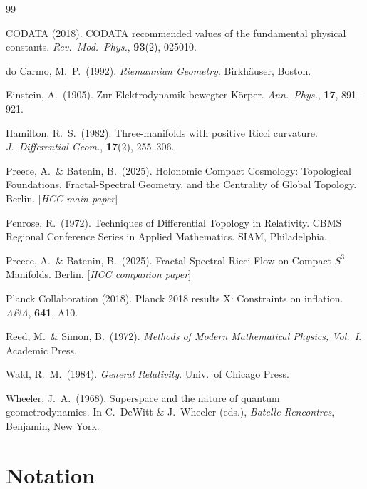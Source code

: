 \documentclass[12pt,a4paper]{article}
\theoremstyle{plain}
\theoremstyle{definition}
\theoremstyle{remark}
\begin{document}
\newpage
\begin{thebibliography}{99}

  CODATA (2018). CODATA recommended values of the fundamental physical constants.
  \textit{Rev.\ Mod.\ Phys.}, \textbf{93}(2), 025010.

  do Carmo, M.\ P.\ (1992). \textit{Riemannian Geometry}. Birkh\"auser, Boston.

  Einstein, A.\ (1905). Zur Elektrodynamik bewegter K\"orper.
  \textit{Ann.\ Phys.}, \textbf{17}, 891--921.

  Hamilton, R.\ S.\ (1982). Three-manifolds with positive Ricci curvature.
  \textit{J.\ Differential Geom.}, \textbf{17}(2), 255--306.

  Preece, A.\ \& Batenin, B.\ (2025).
  Holonomic Compact Cosmology: Topological Foundations,
  Fractal-Spectral Geometry, and the Centrality of Global Topology.
  Berlin. [\textit{HCC main paper}]

  Penrose, R.\ (1972). Techniques of Differential Topology in Relativity.
  CBMS Regional Conference Series in Applied Mathematics.
  SIAM, Philadelphia.

  Preece, A.\ \& Batenin, B.\ (2025).
  Fractal-Spectral Ricci Flow on Compact $S^3$ Manifolds.
  Berlin. [\textit{HCC companion paper}]

  Planck Collaboration (2018). Planck 2018 results X: Constraints on inflation.
  \textit{A\&A}, \textbf{641}, A10.

  Reed, M.\ \& Simon, B.\ (1972).
  \textit{Methods of Modern Mathematical Physics, Vol.~I}. Academic Press.

  Wald, R.\ M.\ (1984). \textit{General Relativity}. Univ.\ of Chicago Press.

  Wheeler, J.\ A.\ (1968). Superspace and the nature of quantum geometrodynamics.
  In C.\ DeWitt \& J.\ Wheeler (eds.),
  \textit{Batelle Rencontres}, Benjamin, New York.

\end{thebibliography}

\appendix

\section{Notation}
\label{app:notation}
\end{document}
